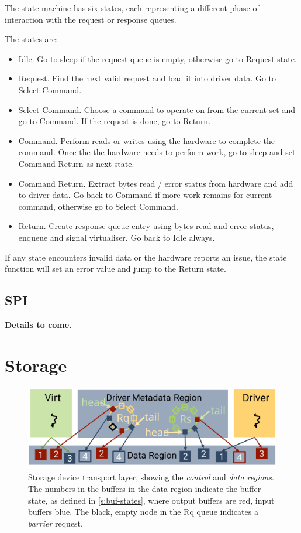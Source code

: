 \documentclass[a4paper,12pt]{report}
\newcommand{\ToCome}[1]{\textbf{#1 to come.}}
\newcommand{\Obj}[1]{\textsl{#1}}
\newcommand{\figscale}{0.2}
\begin{document}
The state machine has six states, each representing a different phase of interaction with
the request or response queues.

The states are:
\begin{itemize}
  \item Idle. Go to sleep if the request queue is empty, otherwise go to Request state.
  \item Request. Find the next valid request and load it into driver data. Go to Select Command.
  \item Select Command. Choose a command to operate on from the current set and go to Command.
    If the request is done, go to Return.
  \item Command. Perform reads or writes using the hardware to complete the command. Once
    the the hardware needs to perform work, go to sleep and set Command Return as next state.
  \item Command Return. Extract bytes read / error status from hardware and add to driver data.
    Go back to Command if more work remains for current command, otherwise go to Select Command.
  \item Return. Create response queue entry using bytes read and error status, enqueue and
    signal virtualiser. Go back to Idle always.
\end{itemize}

If any state encounters invalid data or the hardware reports an issue,
the state function will set an error value and jump to the Return state.

\subsection{SPI}\label{s:cl-spi}

\ToCome{Details}

\section{Storage}\label{s:cl-storage}

\begin{figure}[th]
  \centering
  \includegraphics[scale=\figscale]{metadata-storage}
  \caption[Storage device transport layer.]{Storage device transport layer, showing the
    \Obj{control} and \Obj{data regions}. The numbers in the
    buffers in the data region indicate the buffer state, as defined
    in \autoref{s:buf-states}, where output
    buffers are red, input buffers blue. The black, empty node in the
    Rq queue indicates a \emph{barrier} request.}
  \label{f:control-storage}
\end{figure}
\end{document}
